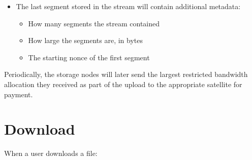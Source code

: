 \documentclass[11pt,fleqn,openany]{book}
\begin{document}
\begin{itemize}
\item The last segment stored in the stream will contain additional metadata:
  \begin{itemize}
  \item How many segments the stream contained
  \item How large the segments are, in bytes
  \item The starting nonce of the first segment
  \end{itemize}
\end{itemize}

Periodically, the storage nodes will later send the largest restricted
bandwidth allocation they received as part of the upload to the appropriate
satellite for payment.

\section{Download}

When a user downloads a file:
\end{document}
